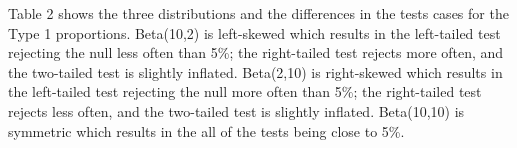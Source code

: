 \documentclass{article}\usepackage[]{graphicx}\usepackage[]{xcolor}
\begin{document}
\begin{enumerate}
\begin{enumerate}
Table 2 shows the three distributions and the differences in the tests cases for the Type 1 proportions. 
Beta(10,2) is left-skewed which results in the left-tailed test rejecting the null less often than 5\%; the right-tailed test rejects more often, and the two-tailed test is slightly inflated. 
Beta(2,10) is right-skewed which results in the left-tailed test rejecting the null more often than 5\%; the right-tailed test rejects less often, and the two-tailed test is slightly inflated. 
Beta(10,10) is symmetric which results in the all of the tests being close to 5\%. 
  \end{enumerate}
\end{enumerate}

\end{document}
